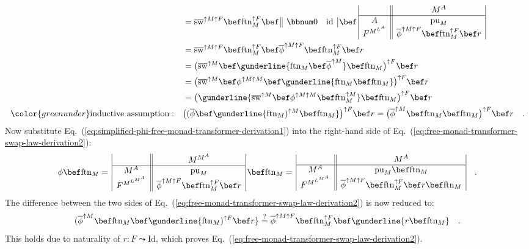\begin{align*}
 & =\overline{\text{sw}}^{\uparrow M\uparrow F}\bef\text{ftn}_{M}^{\uparrow F}\bef\,\begin{array}{||cc|}
\bbnum 0 & \text{id}\end{array}\,\bef\,\begin{array}{|c||c|}
 & M^{A}\\
\hline A & \text{pu}_{M}\\
F^{M^{L^{A}}} & \overline{\phi}^{\uparrow M\uparrow F}\bef\text{ftn}_{M}^{\uparrow F}\bef r
\end{array}\\
 & =\overline{\text{sw}}^{\uparrow M\uparrow F}\bef\text{ftn}_{M}^{\uparrow F}\bef\overline{\phi}^{\uparrow M\uparrow F}\bef\text{ftn}_{M}^{\uparrow F}\bef r\\
 & =\big(\overline{\text{sw}}^{\uparrow M}\bef\gunderline{\text{ftn}_{M}\bef\overline{\phi}^{\uparrow M}}\bef\text{ftn}_{M}\big)^{\uparrow F}\bef r\\
 & =\big(\overline{\text{sw}}^{\uparrow M}\bef\phi^{\uparrow M\uparrow M}\bef\gunderline{\text{ftn}_{M}\bef\text{ftn}_{M}}\big)^{\uparrow F}\bef r\\
 & =\big(\gunderline{\overline{\text{sw}}^{\uparrow M}\bef\phi^{\uparrow M\uparrow M}\bef\text{ftn}_{M}^{\uparrow M}}\bef\text{ftn}_{M}\big)^{\uparrow F}\bef r\\
{\color{greenunder}\text{inductive assumption}:}\quad & \big((\overline{\phi}\bef\gunderline{\text{ftn}_{M})^{\uparrow M}\bef\text{ftn}_{M}}\big)^{\uparrow F}\bef r=\big(\overline{\phi}^{\uparrow M}\bef\text{ftn}_{M}\bef\text{ftn}_{M}\big)^{\uparrow F}\bef r\quad.
\end{align*}
Now substitute Eq.~(\ref{eq:simplified-phi-free-monad-transformer-derivation1})
into the right-hand side of Eq.~(\ref{eq:free-monad-transformer-swap-law-derivation2}):
\[
\phi\bef\text{ftn}_{M}=\,\begin{array}{|c||c|}
 & M^{M^{A}}\\
\hline M^{A} & \text{pu}_{M}\\
F^{M^{L^{M^{A}}}} & \overline{\phi}^{\uparrow M\uparrow F}\bef\text{ftn}_{M}^{\uparrow F}\bef r
\end{array}\,\bef\text{ftn}_{M}=\,\begin{array}{|c||c|}
 & M^{A}\\
\hline M^{A} & \text{pu}_{M}\bef\text{ftn}_{M}\\
F^{M^{L^{M^{A}}}} & \overline{\phi}^{\uparrow M\uparrow F}\bef\text{ftn}_{M}^{\uparrow F}\bef r\bef\text{ftn}_{M}
\end{array}\quad.
\]
The difference between the two sides of Eq.~(\ref{eq:free-monad-transformer-swap-law-derivation2})
is now reduced to:
\[
(\overline{\phi}^{\uparrow M}\bef\text{ftn}_{M}\bef\gunderline{\text{ftn}_{M})^{\uparrow F}\bef r}\overset{?}{=}\overline{\phi}^{\uparrow M\uparrow F}\bef\text{ftn}_{M}^{\uparrow F}\bef\gunderline{r\bef\text{ftn}_{M}}\quad.
\]
This holds due to naturality of $r:F\leadsto\text{Id}$, which proves
Eq.~(\ref{eq:free-monad-transformer-swap-law-derivation2}).

